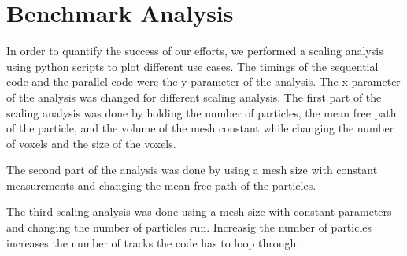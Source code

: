 \section{Benchmark Analysis}
In order to quantify the success of our efforts, we performed a scaling analysis 
using python scripts to plot different use cases. The timings of the sequential 
code and the parallel code were the y-parameter of the analysis. 
The x-parameter of the analysis was changed for different scaling analysis.  
The first part of the scaling analysis was done by holding the number of particles, 
the mean free path of the particle, and the volume of the mesh constant while changing 
the number of voxels and the size of the voxels. 


The second part of the analysis was done by using a mesh size with constant measurements 
and changing the mean free path of the particles. 


The third scaling analysis was done using a mesh size with constant parameters and 
changing the number of particles run. Increasig the number of particles increases the 
number of tracks the code has to loop through. 
